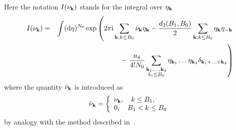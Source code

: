 Here the notation $I(\nu_{\vb k})$ stands for the integral over $\eta_{\vb k}$
\begin{eqnarray*}
	I(\nu_{\vb k}) & = & \int ({\rm d} \eta)^{N_0} \exp
	\left( 2\pi{\rm i} \sum_{\vb k, k \leq B_0} \bar{\nu}_{\vb k} \eta_{\vb k} - \frac{d_2(B_1, B_0)}{2} \sum_{\vb k, k \leq B_0} \eta_{\vb k} \eta_{-\vb k}
	\right.
	\\
	&& - \left. \frac{a_4}{4! N_0} \sum_{\substack{\vb k_1, \dotsc, \vb k_4 \\ k_i \leq B_0}} \eta_{\vb k_1} \dotsc \eta_{\vb k_4} \delta_{\vb{k}_1 + \dotsc + \vb{k}_4} \right)
\end{eqnarray*}
where the quantity $\bar{\nu}_{\vb k}$ is introduced as
\begin{equation*}
	\bar{\nu}_{\vb k} = \left\{
	\begin{array}{ll}
		\nu_{\vb k}, \quad k \leq B_1, \\
		0, \quad B_1 < k \leq B_0
	\end{array}
	\right.
\end{equation*}
by analogy with the method described in~\cite{MpkCMP2005}.

